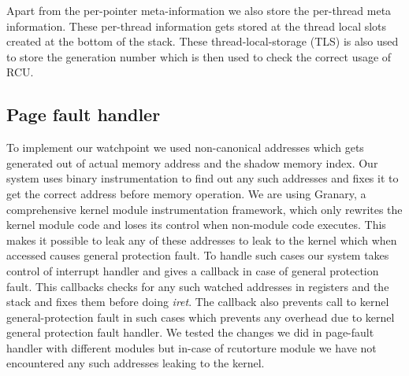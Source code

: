 Apart from the per-pointer meta-information we also store the per-thread meta information. These per-thread information gets stored at the thread local slots created at the bottom of the stack. These thread-local-storage (TLS) is also used to store the generation number which is then used to check the correct usage of RCU.

\subsection{Page fault handler}
To implement our watchpoint we used non-canonical addresses which gets generated out of actual memory address and the shadow memory index. Our system uses binary instrumentation to find out any such addresses and fixes it to get the correct address before memory operation. We are using Granary, a comprehensive kernel module instrumentation framework, which only rewrites the kernel module code and loses its control when non-module code executes. This makes it possible to leak any of these addresses to leak to the kernel which when accessed causes general protection fault. To handle such cases our system takes control of interrupt handler and gives a callback in case of general protection fault. This callbacks checks for any such watched addresses in registers and the stack and fixes them before doing \emph{iret}. The callback also prevents call to kernel general-protection fault in such cases which prevents any overhead due to kernel general protection fault handler. We tested the changes we did in page-fault handler with different modules but in-case of rcutorture module we have not encountered any such addresses leaking to the kernel.

